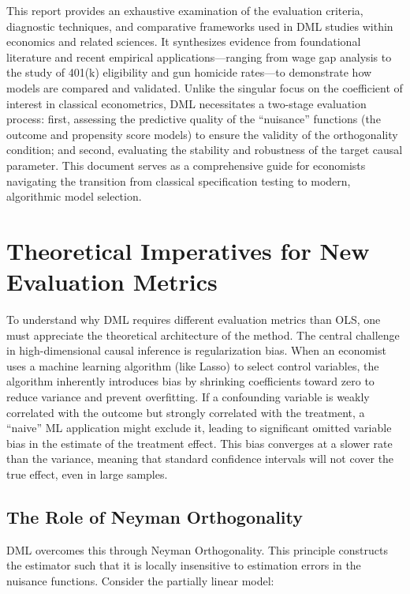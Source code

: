 \documentclass[12pt,a4paper]{article}
\begin{document}
This report provides an exhaustive examination of the evaluation criteria, diagnostic techniques, and comparative frameworks used in DML studies within economics and related sciences. It synthesizes evidence from foundational literature and recent empirical applications---ranging from wage gap analysis to the study of 401(k) eligibility and gun homicide rates---to demonstrate how models are compared and validated. Unlike the singular focus on the coefficient of interest in classical econometrics, DML necessitates a two-stage evaluation process: first, assessing the predictive quality of the ``nuisance'' functions (the outcome and propensity score models) to ensure the validity of the orthogonality condition; and second, evaluating the stability and robustness of the target causal parameter. This document serves as a comprehensive guide for economists navigating the transition from classical specification testing to modern, algorithmic model selection.

\section{Theoretical Imperatives for New Evaluation Metrics}

To understand why DML requires different evaluation metrics than OLS, one must appreciate the theoretical architecture of the method. The central challenge in high-dimensional causal inference is regularization bias. When an economist uses a machine learning algorithm (like Lasso) to select control variables, the algorithm inherently introduces bias by shrinking coefficients toward zero to reduce variance and prevent overfitting. If a confounding variable is weakly correlated with the outcome but strongly correlated with the treatment, a ``naive'' ML application might exclude it, leading to significant omitted variable bias in the estimate of the treatment effect. This bias converges at a slower rate than the variance, meaning that standard confidence intervals will not cover the true effect, even in large samples.

\subsection{The Role of Neyman Orthogonality}

DML overcomes this through Neyman Orthogonality. This principle constructs the estimator such that it is locally insensitive to estimation errors in the nuisance functions. Consider the partially linear model:
\end{document}
